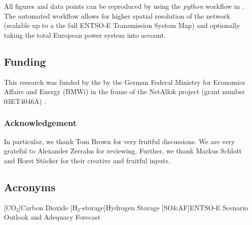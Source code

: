\documentclass[11pt,twocolumn]{article}
\begin{document}
All figures and data points can be reproduced by using the \textit{python} workflow in \cite{hofmann_pypsa-costallocation_2020}. The automated workflow allows for higher spatial resolution of the network (scalable up to a the full ENTSO-E Transmission System Map) and optionally taking the total European power system into account.  

\subsection*{Funding}
This research was funded by the by the German Federal Ministry for Economics Affairs and Energy (BMWi) in
the frame of the NetAllok project (grant number 03ET4046A) \cite{bundesministerium_fur_wirtschaft_und_energie_verbundvorhaben_nodate}. 

\subsubsection*{Acknowledgement}

In particular, we thank Tom Brown for very fruitful discussions. We are very grateful to Alexander Zerrahn for reviewing. Further, we thank Markus Schlott and Horst Stöcker for their creative and fruitful inputs.




\clearpage
\appendix
\subsection*{Acronyms}
\begin{acronym}[UMLX]
    [CO$_2$]{Carbon Dioxide}
    [H$_2$-storage]{Hydrogen Storage}
    [SO\&AF]{\acs*{ENTSO-E} Scenario Outlook and Adequacy Forecast}
\end{acronym}
\end{document}
